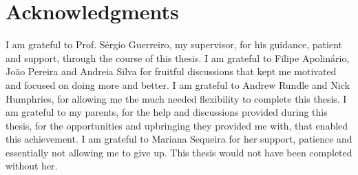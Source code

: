 \chapter*{Acknowledgments}

I am grateful to Prof. Sérgio Guerreiro, my supervisor, for his guidance, patient and support, through the course of this thesis. I am grateful to Filipe Apolinário, João Pereira and Andreia Silva for fruitful discussions that kept me motivated and focused on doing more and better. I am grateful to Andrew Rundle and Nick Humphries, for allowing me the much needed flexibility to complete this thesis. I am grateful to my parents, for the help and discussions provided during this thesis, for the opportunities and upbringing they provided me with, that enabled this achievement. I am grateful to Mariana Sequeira for her support, patience and essentially not allowing me to give up. This thesis would not have been completed without her.